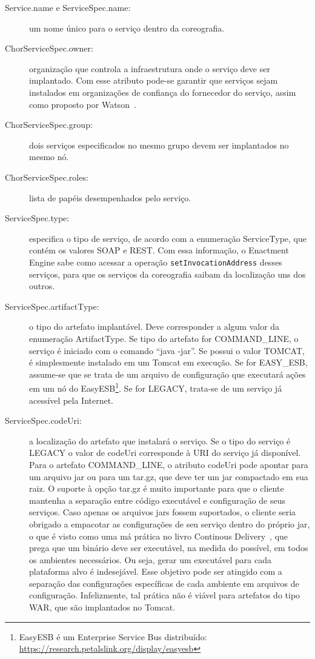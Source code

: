 \begin{description}

\item [Service.name e ServiceSpec.name:] um nome único para o serviço dentro da coreografia.

\item [ChorServiceSpec.owner:] organização que controla a infraestrutura onde o serviço deve ser implantado. Com esse atributo pode-se garantir que serviços sejam instalados em organizações de confiança do fornecedor do serviço, assim como proposto por Watson~\cite{Watson2006Dynasoar}.

\item [ChorServiceSpec.group:] dois serviços especificados no mesmo grupo devem ser implantados no mesmo nó.

\item [ChorServiceSpec.roles:] lista de papéis desempenhados pelo serviço.

\item [ServiceSpec.type:] especifica o tipo de serviço, de acordo com a enumeração ServiceType, que contém os valores SOAP e REST. Com essa informação, o Enactment Engine sabe como acessar a operação \texttt{setInvocationAddress} desses serviços, para que os serviços da coreografia saibam da localização uns dos outros. 

\item [ServiceSpec.artifactType:] o tipo do artefato implantável. Deve corresponder a algum valor da enumeração ArtifactType. Se tipo do artefato for COMMAND\_LINE, o serviço é iniciado com o comando ``java -jar''. Se possui o valor TOMCAT, é simplesmente instalado em um Tomcat em execução. Se for EASY\_ESB, assume-se que se trata de um arquivo de configuração que executará ações em um nó do EasyESB\footnote{EasyESB é um Enterprise Service Bus distribuído: \url{https://research.petalslink.org/display/easyesb}}. Se for LEGACY, trata-se de um serviço já acessível pela Internet.

\item [ServiceSpec.codeUri:] a localização do artefato que instalará o serviço. Se o tipo do serviço é LEGACY o valor de codeUri corresponde à URI do serviço já disponível. Para o artefato COMMAND\_LINE, o atributo codeUri pode apontar para um arquivo jar ou para um tar.gz, que deve ter um jar compactado em sua raiz. O suporte à opção tar.gz é muito importante para que o cliente mantenha a separação entre código executável e configuração de seus serviços. Caso apenas os arquivos jars fossem suportados, o cliente seria obrigado a empacotar as configurações de seu serviço dentro do próprio jar, o que é visto como uma má prática no livro Continous Delivery~\cite{Humble2011Continuous}, que prega que um binário deve ser executável, na medida do possível, em todos os ambientes necessários. Ou seja, gerar um executável para cada plataforma alvo é indesejável. Esse objetivo pode ser atingido com a separação das configurações específicas de cada ambiente em arquivos de configuração. Infelizmente, tal prática não é viável para artefatos do tipo WAR, que são implantados no Tomcat.


\end{description}
